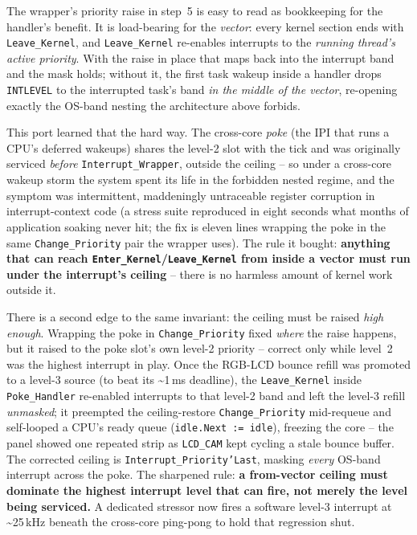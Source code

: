The wrapper's priority raise in step~5 is easy to read as bookkeeping for
the handler's benefit.  It is load-bearing for the \emph{vector}: every
kernel section ends with \texttt{Leave\_Kernel}, and \texttt{Leave\_Kernel}
re-enables interrupts to the \emph{running thread's active priority}.  With
the raise in place that maps back into the interrupt band and the mask
holds; without it, the first task wakeup inside a handler drops
\texttt{INTLEVEL} to the interrupted task's band \emph{in the middle of the
vector}, re-opening exactly the OS-band nesting the architecture above
forbids.

This port learned that the hard way.  The cross-core \emph{poke} (the IPI
that runs a CPU's deferred wakeups) shares the level-2 slot with the tick
and was originally serviced \emph{before} \texttt{Interrupt\_Wrapper},
outside the ceiling -- so under a cross-core wakeup storm the system spent
its life in the forbidden nested regime, and the symptom was intermittent,
maddeningly untraceable register corruption in interrupt-context code (a
stress suite reproduced in eight seconds what months of application soaking
never hit; the fix is eleven lines wrapping the poke in the same
\texttt{Change\_Priority} pair the wrapper uses).  The rule it bought:
\textbf{anything that can reach \texttt{Enter\_Kernel}/\texttt{Leave\_Kernel}
from inside a vector must run under the interrupt's ceiling} -- there is no
harmless amount of kernel work outside it.

There is a second edge to the same invariant: the ceiling must be raised
\emph{high enough}.  Wrapping the poke in \texttt{Change\_Priority} fixed
\emph{where} the raise happens, but it raised to the poke slot's own level-2
priority -- correct only while level~2 was the highest interrupt in play.
Once the RGB-LCD bounce refill was promoted to a level-3 source (to beat its
\textasciitilde1\,ms deadline), the \texttt{Leave\_Kernel} inside
\texttt{Poke\_Handler} re-enabled interrupts to that level-2 band and left the
level-3 refill \emph{unmasked}; it preempted the ceiling-restore
\texttt{Change\_Priority} mid-requeue and self-looped a CPU's ready queue
(\texttt{idle.Next := idle}), freezing the core -- the panel showed one
repeated strip as \texttt{LCD\_CAM} kept cycling a stale bounce buffer.  The
corrected ceiling is \texttt{Interrupt\_Priority'Last}, masking \emph{every}
OS-band interrupt across the poke.  The sharpened rule: \textbf{a from-vector
ceiling must dominate the highest interrupt level that can fire, not merely
the level being serviced.}  A dedicated stressor now fires a software
level-3 interrupt at \textasciitilde25\,kHz beneath the cross-core ping-pong
to hold that regression shut.


